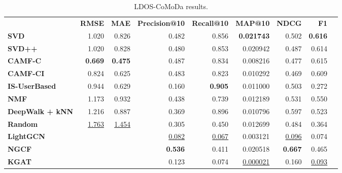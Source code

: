 \begin{table}[!htp]\centering
\caption{LDOS-CoMoDa results.}\label{tab:comodatable}
\scriptsize
\begin{tabular}{lrrrrrrrr}\toprule
&\textbf{RMSE} &\textbf{MAE} &\textbf{Precision@10} &\textbf{Recall@10} &\textbf{MAP@10} &\textbf{NDCG} &\textbf{F1} \\\cmidrule{2-8}
\textbf{SVD} &1.020 &0.826 &0.482 &0.856 &\textbf{0.021743} &0.502 &\textbf{0.616} \\\cmidrule{1-8}
\textbf{SVD++} &1.020 &0.828 &0.480 &0.853 &0.020942 &0.487 &0.614 \\\cmidrule{1-8}
\textbf{CAMF-C} &\textbf{0.669} &\textbf{0.475} &0.487 &0.834 &0.008216 &0.477 &0.615 \\\cmidrule{1-8}
\textbf{CAMF-CI} &0.824 &0.625 &0.483 &0.823 &0.010292 &0.469 &0.609 \\\cmidrule{1-8}
\textbf{IS-UserBased} &0.944 &0.629 &0.160 &\textbf{0.905} &0.011000 &0.503 &0.272 \\\cmidrule{1-8}
\textbf{NMF} &1.173 &0.932 &0.438 &0.739 &0.012189 &0.531 &0.550 \\\cmidrule{1-8}
\textbf{DeepWalk + kNN} &1.216 &0.887 &0.369 &0.896 &0.010796 &0.597 &0.523 \\\cmidrule{1-8}
\textbf{Random} &\ul{1.763} &\ul{1.454} &0.305 &0.450 &0.012699 &0.484 &0.364 \\\cmidrule{1-8}
\textbf{LightGCN} & & &\ul{0.082} &\ul{0.067} &0.003121 &\ul{0.096} &0.074 \\\cmidrule{1-1}\cmidrule{1-8}
\textbf{NGCF} & & &\textbf{0.536} &0.411 &0.020518 &\textbf{0.667} &0.465 \\\midrule
\textbf{KGAT} & & &0.123 &0.074 &\ul{0.000021} &0.160 &\ul{0.093} \\
\bottomrule
\end{tabular}
\end{table}

